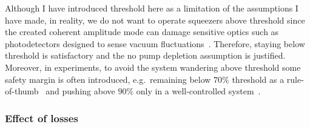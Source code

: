 Although I have introduced threshold here as a limitation of the assumptions I have made, in reality, we do not want to operate squeezers above threshold since the created coherent amplitude mode can damage sensitive optics such as photodetectors designed to sense vacuum fluctuations~\cite{}. Therefore, staying below threshold is satisfactory and the no pump depletion assumption is justified. Moreover, in experiments, to avoid the system wandering above threshold some safety margin is often introduced, e.g.\ remaining below $70\%$ threshold as a rule-of-thumb~\cite{} and pushing above $90\%$ only in a well-controlled system~\cite{}.  %

\subsubsection{Effect of losses}

